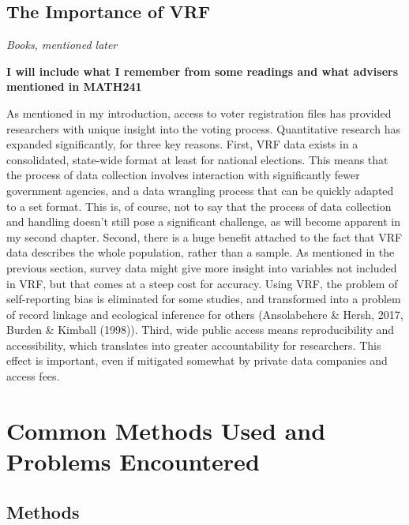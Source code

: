 \documentclass[12pt,twoside]{reedthesis}
\begin{document}
  \subsection{The Importance of VRF}\label{the-importance-of-vrf}
  
  \emph{Books, mentioned later}
  
  \textbf{I will include what I remember from some readings and what
  advisers mentioned in MATH241}
  
  As mentioned in my introduction, access to voter registration files has
  provided researchers with unique insight into the voting process.
  Quantitative research has expanded significantly, for three key reasons.
  First, VRF data exists in a consolidated, state-wide format at least for
  national elections. This means that the process of data collection
  involves interaction with significantly fewer government agencies, and a
  data wrangling process that can be quickly adapted to a set format. This
  is, of course, not to say that the process of data collection and
  handling doesn't still pose a significant challenge, as will become
  apparent in my second chapter. Second, there is a huge benefit attached
  to the fact that VRF data describes the whole population, rather than a
  sample. As mentioned in the previous section, survey data might give
  more insight into variables not included in VRF, but that comes at a
  steep cost for accuracy. Using VRF, the problem of self-reporting bias
  is eliminated for some studies, and transformed into a problem of record
  linkage and ecological inference for others (Ansolabehere \& Hersh,
  2017, Burden \& Kimball (1998)). Third, wide public access means
  reproducibility and accessibility, which translates into greater
  accountability for researchers. This effect is important, even if
  mitigated somewhat by private data companies and access fees.
  
  \section{Common Methods Used and Problems
  Encountered}\label{common-methods-used-and-problems-encountered}
  
  \subsection{Methods}\label{methods}
  
\end{document}
